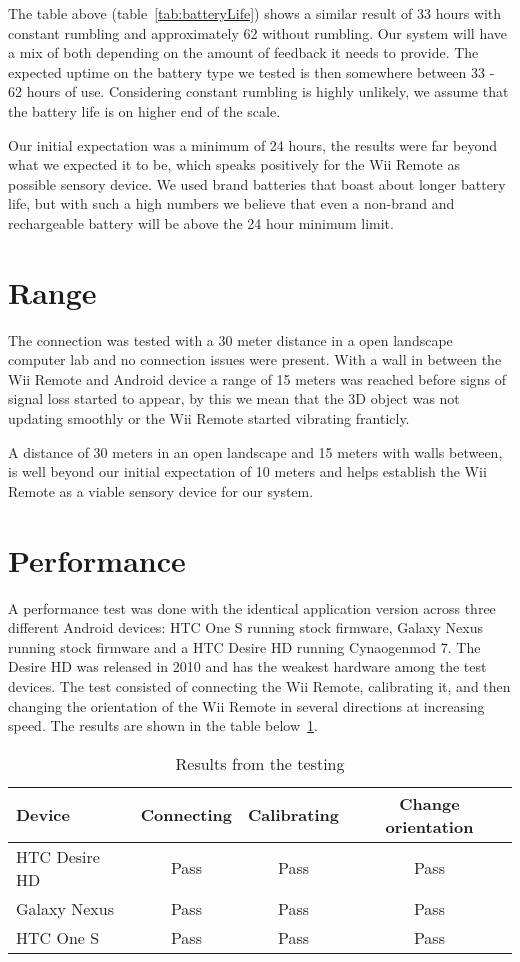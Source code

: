 The table above (table~\ref{tab:batteryLife}) shows a similar result of 33 hours with constant rumbling and approximately 62 without rumbling. Our system will have a mix of both depending on the amount of feedback it needs to provide. The expected uptime on the battery type we tested is then somewhere between 33 - 62 hours of use. Considering constant rumbling is highly unlikely, we assume that the battery life is on higher end of the scale.

Our initial expectation was a minimum of 24 hours, the results were far beyond what we expected it to be, which speaks positively for the Wii Remote as possible sensory device. We used brand batteries that boast about longer battery life, but with such a high numbers we believe that even a non-brand and rechargeable battery will be above the 24 hour minimum limit.

\section{Range}
The connection was tested with a 30 meter distance in a open landscape computer lab and no connection issues were present. With a wall in between the Wii Remote and Android device a range of 15 meters was reached before signs of signal loss started to appear, by this we mean that the 3D object was not updating smoothly or the Wii Remote started vibrating franticly.

A distance of 30 meters in an open landscape and 15 meters with walls between, is well beyond our initial expectation of 10 meters and helps establish the Wii Remote as a viable sensory device for our system.

\section{Performance}
A performance test was done with the identical application version across three different Android devices: HTC One S running stock firmware, Galaxy Nexus running stock firmware and a HTC Desire HD running Cynaogenmod 7. The Desire HD was released in 2010 and has the weakest hardware among the test devices. The test consisted of connecting the Wii Remote, calibrating it, and then changing the orientation of the Wii Remote in several directions at increasing speed. The results are shown in the table below~\ref{tab:testResults}.

\begin{table}[h!]
\centering
\begin{tabularx}{\textwidth}{|X||c|c|c|}
\hline
\textbf{Device} & \textbf{Connecting} & \textbf{Calibrating} & \textbf{Change orientation} \\ \hline
HTC Desire HD & Pass & Pass & Pass \\ \hline
Galaxy Nexus & Pass & Pass & Pass \\ \hline
HTC One S & Pass & Pass & Pass \\ \hline

\end{tabularx}
\caption{\footnotesize Results from the testing}
\label{tab:testResults}
\end{table}

